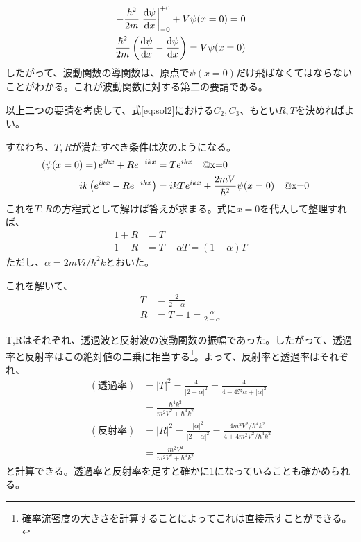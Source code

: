 \documentclass[uplatex,dvipdfmx]{jsarticle}
\begin{document}
\begin{align}
    -\frac{\hbar^2}{2m} \eval{\dv{\psi}{x}}_{-0}^{+0} + V\psi(x=0) = 0 \\
    \frac{\hbar^2}{2m} \left(\dv{\psi}{x} (x=+0)-\dv{\psi}{x} (x=-0)\right) = V\psi(x=0)
\end{align}
したがって、波動関数の導関数は、原点で$\psi(x=0)$だけ飛ばなくてはならないことがわかる。これが波動関数に対する第二の要請である。


以上二つの要請を考慮して、式\ref{eq:sol2}における$C_2,C_3$、もとい$R,T$を決めればよい。

すなわち、$T,R$が満たすべき条件は次のようになる。
\begin{align}
    \left(\psi(x=0) =\right) e^{ikx} + R e^{-ikx} &= T e^{ikx} \qq{@x=0} \\
    ik\left(e^{ikx} - R e^{-ikx} \right) &= ikT e^{ikx}+\frac{2mV}{\hbar^2}\psi(x=0) \qq{@x=0}
\end{align}
これを$T,R$の方程式として解けば答えが求まる。式に$x=0$を代入して整理すれば、
\begin{align}
    1 + R &= T \\
    1 - R &= T - \alpha T = (1-\alpha)T   
\end{align}
ただし、$\alpha = 2mVi/\hbar^2k$とおいた。

これを解いて、
\begin{align}
    T &= \frac{2}{2-\alpha} \\
    R &= T-1 = \frac{\alpha}{2-\alpha}
\end{align}

T,Rはそれぞれ、透過波と反射波の波動関数の振幅であった。したがって、透過率と反射率はこの絶対値の二乗に相当する\footnote{確率流密度の大きさを計算することによってこれは直接示すことができる。}。よって、反射率と透過率はそれぞれ、
\begin{align}
    (透過率) &= |T|^2 = \frac{4}{|2-\alpha|^2}
    = \frac{4}{4-4\Re{\alpha}+|\alpha|^2}\\
    &= \frac{\hbar^4k^2}{m^2V^2+\hbar^4k^2} \\
    (反射率) &= |R|^2 = \frac{|\alpha|^2}{|2-\alpha|^2} = \frac{4m^2V^2/\hbar^4k^2}{4+4m^2V^2/\hbar^4k^2} \\
    &= \frac{m^2V^2}{m^2V^2+\hbar^4k^2}    
\end{align}
と計算できる。透過率と反射率を足すと確かに1になっていることも確かめられる。
\end{document}
